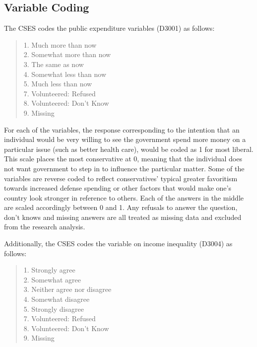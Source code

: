 \documentclass[12pt, titlepage]{article}
\begin{document}
\begin{appendices}
\subsection{Variable Coding}

The CSES codes the public expenditure variables (D3001) as follows:

\begin{quote}
	
	1. Much more than now \\ 
	2. Somewhat more than now \\
	3. The same as now \\ 
	4. Somewhat less than now \\
	5. Much less than now \\
	7. Volunteered: Refused \\
	8. Volunteered: Don't Know \\
	9. Missing

\end{quote}

For each of the variables, the response corresponding to the intention that an individual would be very willing to see the government spend more money on a particular issue (such as better health care), would be coded as 1 for most liberal. This scale places the most conservative at 0, meaning that the individual does not want government to step in to influence the particular matter. Some of the variables are reverse coded to reflect conservatives' typical greater favoritism towards increased defense spending or other factors that would make one's country look stronger in reference to others. Each of the answers in the middle are scaled accordingly between 0 and 1. Any refusals to answer the question, don't knows and missing answers are all treated as missing data and excluded from the research analysis.

Additionally, the CSES codes the variable on income inequality (D3004) as follows: 

\begin{quote}

	1. Strongly agree \\
	2. Somewhat agree \\
	3. Neither agree nor disagree \\
	4. Somewhat disagree \\
	5. Strongly disagree \\ 
	7. Volunteered: Refused \\
	8. Volunteered: Don't Know \\
	9. Missing
\end{quote}	


\end{appendices}
\end{document}
